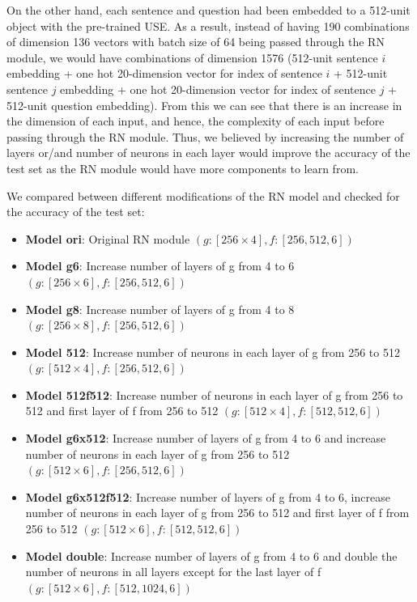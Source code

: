 \documentclass{article}
\begin{document}
 

On the other hand, each sentence and question had been embedded to a 512-unit object with the pre-trained USE. As a result, instead of having 190 combinations of dimension 136 vectors with batch size of 64 being passed through the RN module, we would have combinations of dimension 1576 (512-unit sentence $i$ embedding + one hot 20-dimension vector for index of sentence $i$ + 512-unit sentence $j$ embedding + one hot 20-dimension vector for index of sentence $j$ + 512-unit question embedding). From this we can see that there is an increase in the dimension of each input, and hence, the complexity of each input before passing through the RN module. Thus, we believed by increasing the number of layers or/and number of neurons in each layer would improve the accuracy of the test set as the RN module would have more components to learn from.

 

We compared between different modifications of the RN model and checked for the accuracy of the test set:

 

\begin{itemize}

\item \textbf{Model ori}: Original RN module $(g: [256 \times 4], f: [256,512,6])$

\item \textbf{Model g6}: Increase number of layers of g from 4 to 6 $(g: [256 \times 6], f: [256,512,6])$

\item \textbf{Model g8}: Increase number of layers of g from 4 to 8 $(g: [256 \times 8], f: [256,512,6])$

\item \textbf{Model 512}: Increase number of neurons in each layer of g from 256 to 512 $(g: [512 \times 4], f: [256,512,6])$

\item \textbf{Model 512f512}: Increase number of neurons in each layer of g from 256 to 512 and first layer of f from 256 to 512 $(g: [512 \times 4], f: [512,512,6])$

\item \textbf{Model g6x512}: Increase number of layers of g from 4 to 6 and increase number of neurons in each layer of g from 256 to 512 $(g: [512 \times 6], f: [256,512,6])$

\item \textbf{Model g6x512f512}: Increase number of layers of g from 4 to 6, increase number of neurons in each layer of g from 256 to 512 and first layer of f from 256 to 512 $(g: [512 \times 6], f: [512,512,6])$

\item \textbf{Model double}: Increase number of layers of g from 4 to 6 and double the number of neurons in all layers except for the last layer of f $(g: [512 \times 6], f: [512,1024,6])$

\end{itemize}
\end{document}
